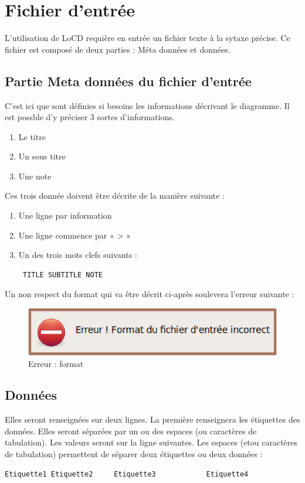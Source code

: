 \chapter{Fichier d'entrée}
\label{chap:fichDonnees}
L'utilisation de LoCD requière en entrée un fichier texte à la sytaxe précise. Ce fichier est composé de deux parties : Méta données et données.%
\section{Partie Meta données du fichier d'entrée}
C'est ici que sont définies si besoins les informations décrivant le diagramme. Il est possble d'y préciser 3 sortes d'informations. 
\begin{enumerate}
\item
  Le titre 
\item
  Un sous titre
\item
  Une note
\end{enumerate}
Ces trois donnée doivent être décrite de la manière suivante : 
\begin{enumerate}
\item
  Une ligne par information 
\item
  Une ligne commence par  « > »
\item
  Un des trois mots clefs suivants : \begin{verbatim} TITLE SUBTITLE NOTE \end{verbatim}
\end{enumerate}
Un non respect du format qui va être décrit ci-après soulevera l'erreur suivante : 
\begin{figure}[htbp]
  \centering
  \includegraphics[scale=0.40]{img/eformatfichier}
  \caption{Erreur : format}
  \label{fig:enbdonees}
\end{figure}


\section{Données}
Elles seront renseignées sur deux lignes. La première renseignera les étiquettes des données. Elles seront séparées par un ou des espaces (ou caractères de tabulation). Les valeurs seront sur la ligne suivantes. Les espaces (et\/ou caractères de tabulation) permettent de séparer deux étiquettes ou deux données :
\begin{verbatim}
Etiquette1 Etiquette2     Etiquette3 			Etiquette4
 \end{verbatim} 
 
